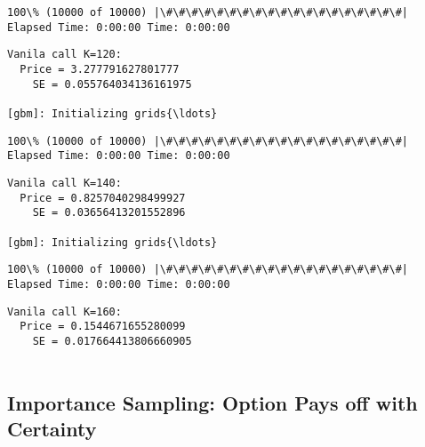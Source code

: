 \documentclass[11pt]{article}
\begin{document}
    \begin{Verbatim}[commandchars=\\\{\}]
100\% (10000 of 10000) |\#\#\#\#\#\#\#\#\#\#\#\#\#\#\#\#\#\#\#| Elapsed Time: 0:00:00 Time: 0:00:00

    \end{Verbatim}

    \begin{Verbatim}[commandchars=\\\{\}]
Vanila call K=120:
  Price = 3.277791627801777
    SE = 0.055764034136161975

[gbm]: Initializing grids{\ldots}

    \end{Verbatim}

    \begin{Verbatim}[commandchars=\\\{\}]
100\% (10000 of 10000) |\#\#\#\#\#\#\#\#\#\#\#\#\#\#\#\#\#\#\#| Elapsed Time: 0:00:00 Time: 0:00:00

    \end{Verbatim}

    \begin{Verbatim}[commandchars=\\\{\}]
Vanila call K=140:
  Price = 0.8257040298499927
    SE = 0.03656413201552896

[gbm]: Initializing grids{\ldots}

    \end{Verbatim}

    \begin{Verbatim}[commandchars=\\\{\}]
100\% (10000 of 10000) |\#\#\#\#\#\#\#\#\#\#\#\#\#\#\#\#\#\#\#| Elapsed Time: 0:00:00 Time: 0:00:00

    \end{Verbatim}

    \begin{Verbatim}[commandchars=\\\{\}]
Vanila call K=160:
  Price = 0.1544671655280099
    SE = 0.017664413806660905


    \end{Verbatim}

    \subsection{Importance Sampling: Option Pays off with
Certainty}\label{importance-sampling-option-pays-off-with-certainty}
\end{document}
